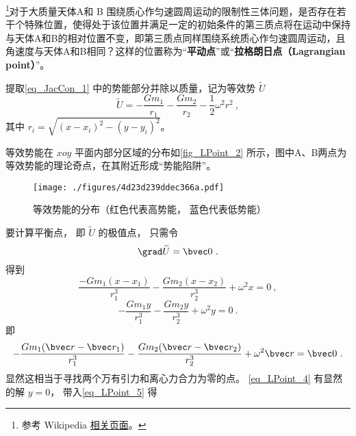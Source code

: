 
\begin{issues}
\issueTODO
\end{issues}


\footnote{参考 Wikipedia \href{https://en.wikipedia.org/wiki/Lagrange_point}{相关页面}。}对于大质量天体A和 B 围绕质心作匀速圆周运动的限制性三体问题，是否存在若干个特殊位置，使得处于该位置并满足一定的初始条件的第三质点将在运动中保持与天体A和B的相对位置不变，即第三质点同样围绕系统质心作匀速圆周运动，且角速度与天体A和B相同？这样的位置称为“\textbf{平动点}”或“\textbf{拉格朗日点（Lagrangian point）}”。

提取\autoref{eq_JacCon_1} 中的势能部分并除以质量，记为等效势 $\widetilde{U}$ 
\begin{equation}
\widetilde{U} = -\frac{Gm_1}{r_1} -\frac{Gm_2}{r_2} -\frac{1}{2}\omega^2 r^2~,
\end{equation}
其中 $r_i = \sqrt{(x - x_i)^2 - (y - y_i)^2}$。

等效势能在 $xoy$ 平面内部分区域的分布如\autoref{fig_LPoint_2} 所示，图中A、B两点为等效势能的理论奇点，在其附近形成“势能陷阱”。 
\begin{figure}[ht]
\centering
\texttt{[image: ./figures/4d23d239ddec366a.pdf]}
\caption{等效势能的分布（红色代表高势能， 蓝色代表低势能）} \label{fig_LPoint_2}
\end{figure}

要计算平衡点， 即 $\widetilde{U}$ 的极值点， 只需令
\begin{equation}
\grad \widetilde{U} = \bvec 0~.
\end{equation}
得到
\begin{equation}\label{eq_LPoint_5}
\frac{-Gm_1(x-x_1)}{r_1^3} - \frac{Gm_2(x-x_2)}{r_2^3} + \omega^2 x = 0~,
\end{equation}
\begin{equation}\label{eq_LPoint_4}
-\frac{Gm_1 y}{r_1^3} - \frac{Gm_2 y}{r_2^3} + \omega^2 y = 0~.
\end{equation}
即
\begin{equation}
-\frac{Gm_1(\bvec r - \bvec r_1)}{r_1^3} - \frac{Gm_2(\bvec r - \bvec r_2)}{r_2^3} + \omega^2 \bvec r = \bvec 0~.
\end{equation}
显然这相当于寻找两个万有引力和离心力合力为零的点。 \autoref{eq_LPoint_4} 有显然的解 $y = 0$， 带入\autoref{eq_LPoint_5} 得

